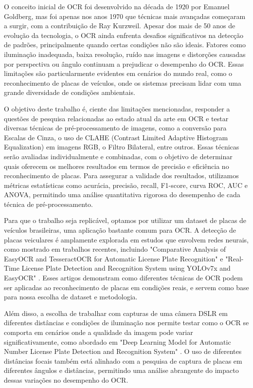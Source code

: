 \documentclass[conference]{IEEEtran}
\begin{document}
O conceito inicial de OCR foi desenvolvido na década de 1920 por Emanuel Goldberg, mas foi apenas nos anos 1970 que técnicas mais avançadas começaram a surgir, com a contribuição de Ray Kurzweil. Apesar dos mais de 50 anos de evolução da tecnologia, o OCR ainda enfrenta desafios significativos na detecção de padrões, principalmente quando certas condições não são ideais. Fatores como iluminação inadequada, baixa resolução, ruído nas imagens e distorções causadas por perspectiva ou ângulo continuam a prejudicar o desempenho do OCR. Essas limitações são particularmente evidentes em cenários do mundo real, como o reconhecimento de placas de veículos, onde os sistemas precisam lidar com uma grande diversidade de condições ambientais.

O objetivo deste trabalho é, ciente das limitações mencionadas, responder a questões de pesquisa relacionadas ao estado atual da arte em OCR e testar diversas técnicas de pré-processamento de imagens, como a conversão para Escalas de Cinza, o uso de CLAHE (Contrast Limited Adaptive Histogram Equalization) em imagens RGB, o Filtro Bilateral, entre outros. Essas técnicas serão avaliadas individualmente e combinadas, com o objetivo de determinar quais oferecem os melhores resultados em termos de precisão e eficiência no reconhecimento de placas. Para assegurar a validade dos resultados, utilizamos métricas estatísticas como acurácia, precisão, recall, F1-score, curva ROC, AUC e ANOVA, permitindo uma análise quantitativa rigorosa do desempenho de cada técnica de pré-processamento.

Para que o trabalho seja replicável, optamos por utilizar um dataset de placas de veículos brasileiras, uma aplicação bastante comum para OCR. A detecção de placas veiculares é amplamente explorada em estudos que envolvem redes neurais, como mostrado em trabalhos recentes, incluindo "Comparative Analysis of EasyOCR and TesseractOCR for Automatic License Plate Recognition" \cite{b1} e "Real-Time License Plate Detection and Recognition System using YOLOv7x and EasyOCR" \cite{b2}. Esses artigos demonstram como diferentes técnicas de OCR podem ser aplicadas ao reconhecimento de placas em condições reais, e servem como base para nossa escolha de dataset e metodologia.

Além disso, a escolha de trabalhar com capturas de uma câmera DSLR em diferentes distâncias e condições de iluminação nos permite testar como o OCR se comporta em cenários onde a qualidade da imagem pode variar significativamente, como abordado em "Deep Learning Model for Automatic Number License Plate Detection and Recognition System" \cite{b3}. O uso de diferentes distâncias focais também está alinhado com a pesquisa de captura de placas em diferentes ângulos e distâncias, permitindo uma análise abrangente do impacto dessas variações no desempenho do OCR.
\end{document}
